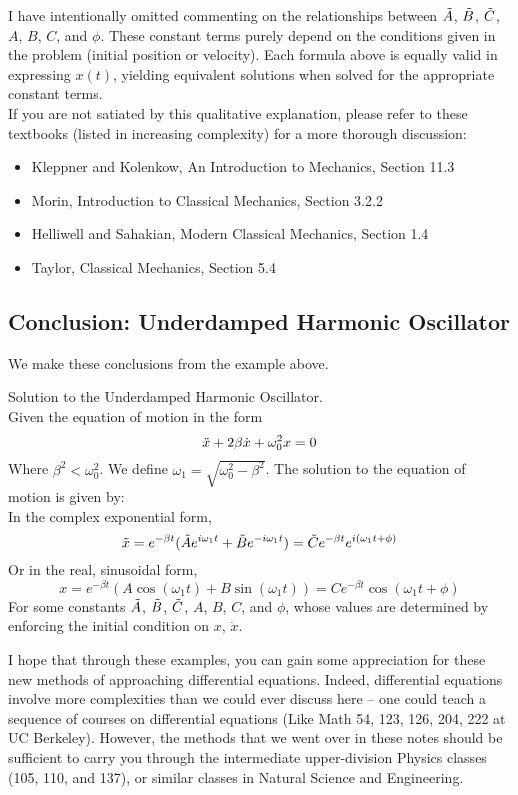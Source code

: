 \documentclass[11pt]{article}
\theoremstyle{gangnamstyle}{\newtheorem{definition}{Definition}[]}
\theoremstyle{gangnamstyle}{\newtheorem{example}{Example}[]}
\theoremstyle{gangnamstyle}{\newtheorem{problem}{Problem}[]}
\theoremstyle{gangnamstyle}{\newtheorem{warning}{Warning}[]}
\begin{document}
I have intentionally omitted commenting on the relationships between $\Tilde{A}$, $\Tilde{B}$, $\Tilde{C}$, $A$, $B$, $C$, and $\phi$. These constant terms purely depend on the conditions given in the problem (initial position or velocity). Each formula above is equally valid in expressing $x(t)$, yielding equivalent solutions when solved for the appropriate constant terms. \\
If you are not satiated by this qualitative explanation, please refer to these textbooks (listed in increasing complexity) for a more thorough discussion: 
\begin{itemize}
\item Kleppner and Kolenkow, An Introduction to Mechanics, Section 11.3
\item Morin, Introduction to Classical Mechanics, Section 3.2.2
\item Helliwell and Sahakian, Modern Classical Mechanics, Section 1.4
\item Taylor, Classical Mechanics, Section 5.4
\end{itemize}

\subsection{Conclusion: Underdamped Harmonic Oscillator}

We make these conclusions from the example above. 
\begin{definition}
Solution to the Underdamped Harmonic Oscillator. \\
Given the equation of motion in the form
\begin{equation}
\Ddot{x} + 2\beta\Dot{x} + \omega_0^2x = 0
\end{equation}
Where $\beta^2 < \omega_0^2$. We define $\omega_1 = \sqrt{\omega_0^2 - \beta^2}$. The solution to the equation of motion is given by: \\
In the complex exponential form, 
\[ \Tilde{x} = e^{-\beta t}(\Tilde{A}e^{i\omega_1 t} + \Tilde{B}e^{-i\omega_1 t}) = \Tilde{C}e^{-\beta t}e^{i(\omega_1t + \phi)} \]
Or in the real, sinusoidal form, 
\[ x = e^{-\beta t}(A\cos(\omega_1 t) + B\sin(\omega_1 t)) = Ce^{-\beta t}\cos(\omega_1 t + \phi) \]
For some constants $\Tilde{A}$, $\Tilde{B}$, $\Tilde{C}$, $A$, $B$, $C$, and $\phi$, whose values are determined by enforcing the initial condition on $x$, $\Dot{x}$. 
\end{definition}
I hope that through these examples, you can gain some appreciation for these new methods of approaching differential equations. Indeed, differential equations involve more complexities than we could ever discuss here -- one could teach a sequence of courses on differential equations (Like Math 54, 123, 126, 204, 222 at UC Berkeley). However, the methods that we went over in these notes should be sufficient to carry you through the intermediate upper-division Physics classes (105, 110, and 137), or similar classes in Natural Science and Engineering. 
\end{document}
